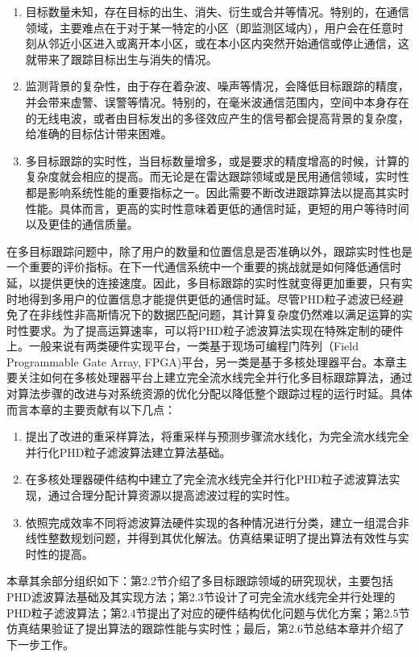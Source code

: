 \begin{enumerate}
  \item 目标数量未知，存在目标的出生、消失、衍生或合并等情况。特别的，在通信领域，主要难点在于对于某一特定的小区（即监测区域内），用户会在任意时刻从邻近小区进入或离开本小区，或在本小区内突然开始通信或停止通信，这就带来了跟踪目标出生与消失的情况。
  \item 监测背景的复杂性，由于存在着杂波、噪声等情况，会降低目标跟踪的精度，并会带来虚警、误警等情况。特别的，在毫米波通信范围内，空间中本身存在的无线电波，或者由目标发出的多径效应产生的信号都会提高背景的复杂度，给准确的目标估计带来困难。
  \item 多目标跟踪的实时性，当目标数量增多，或是要求的精度增高的时候，计算的复杂度就会相应的提高。而无论是在雷达跟踪领域或是民用通信领域，实时性都是影响系统性能的重要指标之一。因此需要不断改进跟踪算法以提高其实时性能。具体而言，更高的实时性意味着更低的通信时延，更短的用户等待时间以及更佳的通信质量。
\end{enumerate}

在多目标跟踪问题中，除了用户的数量和位置信息是否准确以外，跟踪实时性也是一个重要的评价指标。在下一代通信系统中一个重要的挑战就是如何降低通信时延，以提供更快的连接速度。因此，多目标跟踪的实时性就变得更加重要，只有实时地得到多用户的位置信息才能提供更低的通信时延。尽管PHD粒子滤波已经避免了在非线性非高斯情况下的数据匹配问题，其计算复杂度仍然难以满足运算的实时性要求。为了提高运算速率，可以将PHD粒子滤波算法实现在特殊定制的硬件上。一般来说有两类硬件实现平台，一类基于现场可编程门阵列（Field Programmable Gate Array, FPGA)平台\cite{jacobsen2014fpga,hong2011simplified}，另一类是基于多核处理器平台\cite{li2016algorithm}。本章主要关注如何在多核处理器平台上建立完全流水线完全并行化多目标跟踪算法，通过对算法步骤的改进与对系统资源的优化分配以降低整个跟踪过程的运行时延。具体而言本章的主要贡献有以下几点：

\begin{enumerate}
	\item 提出了改进的重采样算法，将重采样与预测步骤流水线化，为完全流水线完全并行化PHD粒子滤波算法建立算法基础。
	\item 在多核处理器硬件结构中建立了完全流水线完全并行化PHD粒子滤波算法实现，通过合理分配计算资源以提高滤波过程的实时性。
	\item 依照完成效率不同将滤波算法硬件实现的各种情况进行分类，建立一组混合非线性整数规划问题，并得到其优化解法。仿真结果证明了提出算法有效性与实时性的提高。
\end{enumerate}

本章其余部分组织如下：第2.2节介绍了多目标跟踪领域的研究现状，主要包括PHD滤波算法基础及其实现方法；第2.3节设计了可完全流水线完全并行处理的PHD粒子滤波算法；第2.4节提出了对应的硬件结构优化问题与优化方案；第2.5节仿真结果验证了提出算法的跟踪性能与实时性；最后，第2.6节总结本章并介绍了下一步工作。

